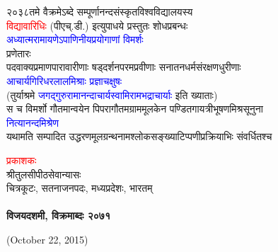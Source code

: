 \documentclass[twoside]{book}
\begin{document}
\begin{titlepage}
\begin{center}
{\fontsize{14}{21} \selectfont \textcolor{BrickRed}{२०३८तमे वैक्रमेऽब्दे सम्पूर्णानन्दसंस्कृतविश्वविद्यालयस्य\\[2pt] \textcolor{red}{विद्यावारिधिः} (पीएच्.डी.) इत्युपाधये प्रस्तुतः शोधप्रबन्धः}}\\[10pt]
{\fontsize{27}{40.5} \selectfont \textcolor{blue}{अध्यात्मरामायणेऽपाणिनीयप्रयोगाणां विमर्शः}}\\[30pt]
 \vfill
{\fontsize{14}{21} \selectfont प्रणेतारः}\\[5pt]
{\fontsize{16}{24} \selectfont \textcolor{BrickRed}{पदवाक्यप्रमाणपारावारीणाः षड्दर्शनपरमप्रवीणाः सनातनधर्मसंरक्षणधुरीणाः}}\\[5pt]
{\fontsize{21}{31.5} \selectfont \textcolor{blue}{आचार्यगिरिधरलालमिश्राः प्रज्ञाचक्षुषः}}\\[5pt]
{\fontsize{16}{24} \selectfont \textcolor{BrickRed}{(तुर्याश्रमे \textcolor{blue}{जगद्गुरुरामानन्दाचार्यस्वामिरामभद्राचार्याः} इति ख्याताः)}}\\[7pt]
\vfill
{\fontsize{14}{21} \selectfont \textcolor{BrickRed}{स च विमर्शो गौतमान्वयेन पिपरागौतमग्राममूलकेन पण्डितगायत्रीभूषणमिश्रसूनुना}}\\[5pt]
{\fontsize{18}{24} \selectfont \textcolor{blue}{नित्यानन्दमिश्रेण}}\\[5pt] 
{\fontsize{14}{21} \selectfont \textcolor{BrickRed}{यथामति सम्पादित उद्धरणमूलग्रन्थनामश्लोकसङ्ख्याटिप्पणीप्रक्रियाभिः संवर्धितश्च}}
\end{center}
\pagebreak
{\fontsize{14}{21} \selectfont \textcolor{red}{प्रकाशकः}}\\[-4pt]

{\fontsize{14}{21} \selectfont श्रीतुलसीपीठसेवान्यासः}\\[-4pt]

{\fontsize{14}{21} \selectfont चित्रकूटः, सतनाजनपदः, मध्यप्रदेशः, भारतम्}\\[-4pt]
\vfill
\noindent {\fontsize{14}{21} \selectfont \textcolor{red}{तृतीयसङ्गणकीयसंस्करणम्}}\\[-4pt]

{\fontsize{14}{21} \selectfont \bfseries विजयदशमी, विक्रमाब्दः २०७१}\\[-4pt]

{\fontsize{14}{21} \selectfont \begin{english}(October 22, 2015)\end{english}}\\[-4pt]
\vfill
{}
\noindent {\fontsize{14}{21} \selectfont \textcolor{red}{\begin{english}©\end{english} सर्वाधिकारः}}\\[-4pt]


\end{titlepage}
\end{document}
